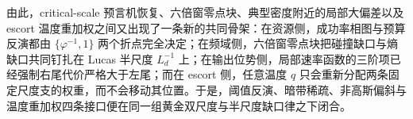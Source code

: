 \noindent
由此，critical-scale 预言机恢复、六倍窗零点块、典型密度附近的局部大偏差以及 escort 温度重加权之间又出现了一条新的共同骨架：在资源侧，成功率相图与预算反演都由 \(\{\varphi^{-1},1\}\) 两个折点完全决定；在频域侧，六倍窗零点块把碰撞缺口与熵缺口共同钉扎在 Lucas 半尺度 \(L_d^{-1}\) 上；在输出位势侧，局部速率函数的三阶项已经强制右尾代价严格大于左尾；而在 escort 侧，任意温度 \(q\) 只会重新分配两条固定尺度支的权重，而不会移动其位置。于是，阈值反演、暗带稀疏、非高斯偏斜与温度重加权四条接口便在同一组黄金双尺度与半尺度缺口律之下闭合。

\endinput
